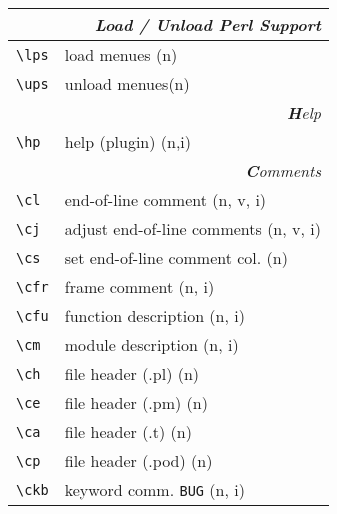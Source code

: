 \documentclass[oneside,10pt,landscape,DIV17]{scrartcl}
\begin{document}
\begin{multicols}{3}
\begin{center}
\begin{tabular}[]{|p{11mm}|p{58mm}|}
\hline
\multicolumn{2}{|r|}{\textsl{\textbf{L}oad / \textbf{U}nload Perl Support}}\\
\hline \verb'\lps'  & load menues  \hfill (n) \\
\hline \verb'\ups'  & unload menues\hfill (n) \\
\hline
\hline 
\multicolumn{2}{|r|}{\textsl{\textbf{H}elp}}    \\
\hline \verb'\hp'   & help (plugin) \hfill (n,i)\\
\hline 
\hline
\multicolumn{2}{|r|}{\textsl{\textbf{C}omments}}                       \\
\hline \verb'\cl'  & end-of-line comment               \hfill (n, v, i)\\
\hline \verb'\cj'  & adjust end-of-line comments       \hfill (n, v, i)\\
\hline \verb'\cs'  & set end-of-line comment col.      \hfill (n)      \\
\hline \verb'\cfr' & frame comment                     \hfill (n, i)   \\
\hline \verb'\cfu' & function description              \hfill (n, i)   \\
\hline \verb'\cm'  & module description                \hfill (n, i)   \\
\hline \verb'\ch'  & file header (.pl)                 \hfill (n)      \\
\hline \verb'\ce'  & file header (.pm)                 \hfill (n)      \\
\hline \verb'\ca'  & file header (.t)                  \hfill (n)      \\
\hline \verb'\cp'  & file header (.pod)                \hfill (n)      \\
\hline \verb'\ckb' & keyword comm. \verb'BUG'          \hfill (n, i)   \\

\end{tabular}
\end{center}
\end{multicols}
\end{document}
